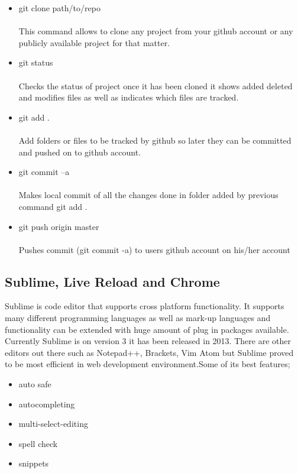 \begin{itemize}
	
\item git clone path/to/repo \\
\\This command allows to clone any project from your github account or any publicly available project for that matter.

\item git status \\
\\Checks the status of project once it has been cloned it shows added deleted and modifies files as well as indicates which files are tracked.

\item git add . \\ 
\\Add folders or files to be tracked by github so later they can be committed and pushed on to github account.

\item git commit –a \\
\\Makes local commit of all the changes done in folder added by previous command git add .

\item git push origin master \\ 
\\ Pushes commit (git commit -a) to users github account on his/her account

\end{itemize}


\subsection{Sublime, Live Reload and Chrome}
\bigbreak
Sublime is code editor that supports cross platform functionality. It supports many different programming languages as well as mark-up languages and functionality can be extended with huge amount of plug in packages available. Currently Sublime is on version 3 it has been released in 2013.
There are other editors out there such as Notepad++, Brackets, Vim Atom but Sublime proved to be most efficient in web development environment.Some of its best features;

\begin{itemize}
	
	\item auto safe 
	\item autocompleting 
	\item multi-select-editing 
	\item spell check 
	\item snippets  

\end{itemize}





